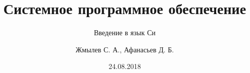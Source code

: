 \documentclass[10pt,pdf,hyperref={unicode}]{beamer}
\title[СПО]{Системное программное обеспечение}
\subtitle{Введение в язык Си}
\author{Жмылев С. А., Афанасьев Д. Б.}
\date{24.08.2018}
\newenvironment{myenv}[2]{
	\renewcommand{\tabcolsep}{0cm}
	\begin{tabular}{p{0.2\linewidth}p{0.8\linewidth}}
	\textbf{#1} & #2
	\end{tabular}
	\it{}
	}
\begin{document}
	\begin{frame}
		\titlepage
	\end{frame}
	 
	\section{Введение в язык Си}
	
	\section{Структура программы}
	\begin{frame}[fragile]
	
		\frametitle{Структура программ}
		
		\begin{CCode}{main.c}
			#include <stdio.h>
			
			void myfunc() {
				printf("Inspiration unlocks the future");
			}
		
			int main(int argc, char *argv[], char *envp[]) { 

				myfunc();			
 				
 				return 0; 
			} \end{CCode}
		
	\end{frame}
	
	\subsection{Аргументы main}
	\begin{frame}[fragile]
		\frametitle{Агрументы main}
		
		\begin{itemize}
		
			\item
			\begin{myenv}{argc}{arguments count}
			Количество переданных программе аргументов, включая имя программы
			\end{myenv}
			
			\item
			\begin{myenv}{*argv[]}{argument vector}
			Массив указателей на каждый из параметров переданных программе аргументов, включая имя программы (агрумент 0)
			\end{myenv}
			
			\item
			\begin{myenv}{*envp[]}{environment parameters}
			Указатель на  массив переменных окружения
			\end{myenv}
			

			
		\end{itemize}
	
	\end{frame}
	
\end{document}
